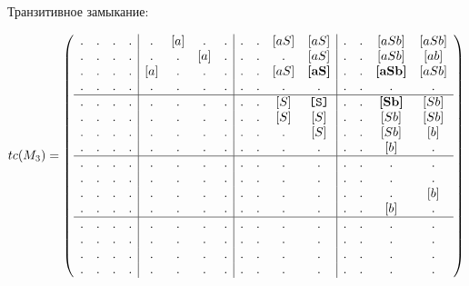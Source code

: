 \begin{example}
Транзитивное замыкание:

\begin{align}
tc(M_3) =
\left(\begin{array}{c c c c | c c c c | c c c c | c c c c } 
. & . & . & .  &  . & [a] & . & .  &  . & . & [aS] & [aS]           &  . & . & [aSb]          & [aSb]  \\
. & . & . & .  &  . & . & [a] & .  &  . & . & .    & [aS]           &  . & . & [aSb]          & [ab]          \\
. & . & . & .  &  [a] & . & . & .  &  . & . & [aS] & \textbf{[aS]}  &  . & . & \textbf{[aSb]} & [aSb]         \\
. & . & . & .  &  . & . & . & .    &  . & . & .    & .              &  . & . & .              & .             \\
\hline
. & . & . & .  &  . & . & . & .    &  . & . & [S] & \texttt{[S]}    &  . & . & \textbf{[Sb]}  & [Sb]    \\
. & . & . & .  &  . & . & . & .    &  . & . & [S] & [S]             &  . & . & [Sb] & [Sb]    \\
. & . & . & .  &  . & . & . & .    &  . & . & .   & [S]             &  . & . & [Sb] & [b]  \\
. & . & . & .  &  . & . & . & .    &  . & . & .   & .               &  . & . & [b]  & .    \\
\hline                                                              
. & . & . & .  &  . & . & . & .    &  . & . & . & .               &  . & . & .    & .   \\
. & . & . & .  &  . & . & . & .    &  . & . & . & .               &  . & . & .    & .   \\
. & . & . & .  &  . & . & . & .    &  . & . & . & .               &  . & . & .    & [b] \\
. & . & . & .  &  . & . & . & .    &  . & . & . & .               &  . & . & [b]  & . \\
\hline                                                              
. & . & . & .  &  . & . & . & .    &  . & . & . & .               &  . & . & . & .   \\
. & . & . & .  &  . & . & . & .    &  . & . & . & .               &  . & . & . & .   \\
. & . & . & .  &  . & . & . & .    &  . & . & . & .               &  . & . & . & .   \\
. & . & . & .  &  . & . & . & .    &  . & . & . & .               &  . & . & . & . 
\end{array}\right)
\label{eq:graph_tm}
\end{align}


\end{example}
